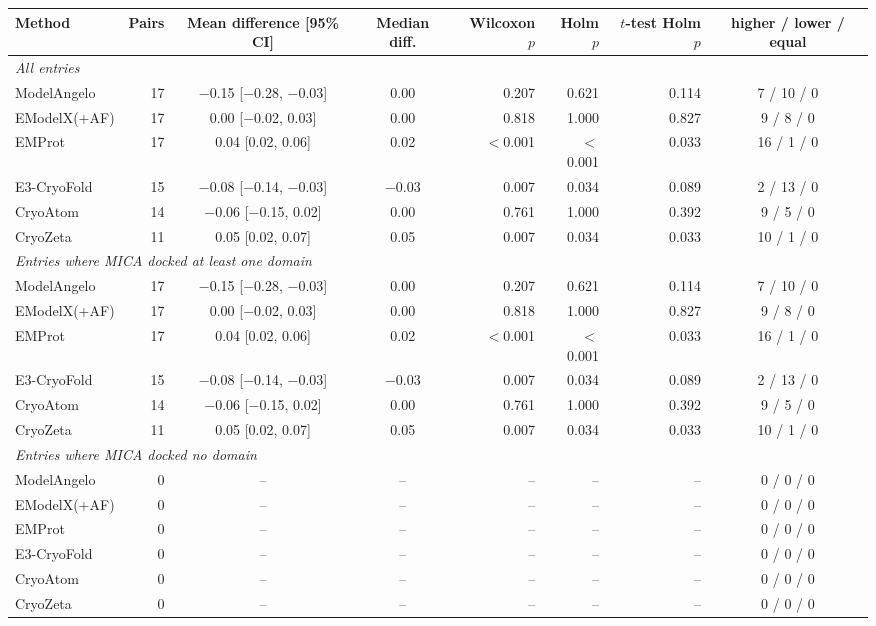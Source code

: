 \begin{tabular}{lrccrrrc}
\toprule
Method & Pairs & Mean difference [95\% CI] & Median diff. & Wilcoxon $p$ & Holm $p$ & $t$-test Holm $p$ & higher / lower / equal \\
\midrule
\multicolumn{8}{l}{\emph{All entries}} \\
ModelAngelo & 17 & $-$0.15 [$-$0.28, $-$0.03] & 0.00 & 0.207 & 0.621 & 0.114 & 7 / 10 / 0 \\
EModelX(+AF) & 17 & 0.00 [$-$0.02, 0.03] & 0.00 & 0.818 & 1.000 & 0.827 & 9 / 8 / 0 \\
EMProt & 17 & 0.04 [0.02, 0.06] & 0.02 & $<$0.001 & $<$0.001 & 0.033 & 16 / 1 / 0 \\
E3-CryoFold & 15 & $-$0.08 [$-$0.14, $-$0.03] & $-$0.03 & 0.007 & 0.034 & 0.089 & 2 / 13 / 0 \\
CryoAtom & 14 & $-$0.06 [$-$0.15, 0.02] & 0.00 & 0.761 & 1.000 & 0.392 & 9 / 5 / 0 \\
CryoZeta & 11 & 0.05 [0.02, 0.07] & 0.05 & 0.007 & 0.034 & 0.033 & 10 / 1 / 0 \\
\midrule
\multicolumn{8}{l}{\emph{Entries where MICA docked at least one domain}} \\
ModelAngelo & 17 & $-$0.15 [$-$0.28, $-$0.03] & 0.00 & 0.207 & 0.621 & 0.114 & 7 / 10 / 0 \\
EModelX(+AF) & 17 & 0.00 [$-$0.02, 0.03] & 0.00 & 0.818 & 1.000 & 0.827 & 9 / 8 / 0 \\
EMProt & 17 & 0.04 [0.02, 0.06] & 0.02 & $<$0.001 & $<$0.001 & 0.033 & 16 / 1 / 0 \\
E3-CryoFold & 15 & $-$0.08 [$-$0.14, $-$0.03] & $-$0.03 & 0.007 & 0.034 & 0.089 & 2 / 13 / 0 \\
CryoAtom & 14 & $-$0.06 [$-$0.15, 0.02] & 0.00 & 0.761 & 1.000 & 0.392 & 9 / 5 / 0 \\
CryoZeta & 11 & 0.05 [0.02, 0.07] & 0.05 & 0.007 & 0.034 & 0.033 & 10 / 1 / 0 \\
\midrule
\multicolumn{8}{l}{\emph{Entries where MICA docked no domain}} \\
ModelAngelo & 0 & --  & -- & -- & -- & -- & 0 / 0 / 0 \\
EModelX(+AF) & 0 & --  & -- & -- & -- & -- & 0 / 0 / 0 \\
EMProt & 0 & --  & -- & -- & -- & -- & 0 / 0 / 0 \\
E3-CryoFold & 0 & --  & -- & -- & -- & -- & 0 / 0 / 0 \\
CryoAtom & 0 & --  & -- & -- & -- & -- & 0 / 0 / 0 \\
CryoZeta & 0 & --  & -- & -- & -- & -- & 0 / 0 / 0 \\
\bottomrule
\end{tabular}
